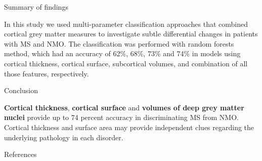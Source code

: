 \documentclass[final]{beamer}
\newlength{\onecolwid}
\begin{document}
\begin{frame}[t]
\begin{columns}[t]
\begin{column}{\onecolwid}
\begin{block}{Summary of findings}

In this study we used multi-parameter classification approaches that combined cortical grey matter measures to investigate subtle differential changes in patients with MS and NMO. The classification was performed with random forests 
method, which had an accuracy of 62\%, 68\%, 73\% and 74\% in models using  cortical thickness, cortical surface, subcortical volumes, and combination of all those features, respectively. 
\end{block}


\begin{alertblock}{Conclusion}

\textbf{Cortical thickness}, \textbf{cortical surface} and \textbf{volumes of deep grey matter nuclei} provide up to 74 percent accuracy in discriminating MS from NMO. Cortical thickness and surface area may provide independent clues regarding the underlying pathology in each disorder.

\end{alertblock} 


\begin{block}{References}

\nocite{*} %
\small{
\vspace{0.6in}}

\end{block}




\end{column} %

\end{columns} %

\end{frame} %
\end{document}
